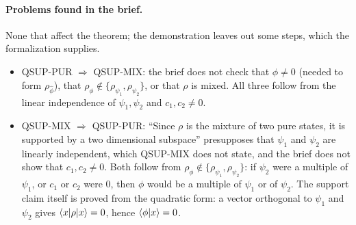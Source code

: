 \documentclass[11pt]{article}
\begin{document}
\paragraph{Problems found in the brief.} None that affect the theorem; the demonstration leaves
out some steps, which the formalization supplies.
\begin{itemize}
\item QSUP-PUR $\Rightarrow$ QSUP-MIX: the brief does not check that $\hat\phi \ne 0$ (needed to
  form $\rho_{\hat\phi}$), that $\rho_\phi \notin \{\rho_{\psi_1}, \rho_{\psi_2}\}$, or that $\rho$
  is mixed. All three follow from the linear independence of $\psi_1, \psi_2$ and
  $c_1, c_2 \ne 0$.
\item QSUP-MIX $\Rightarrow$ QSUP-PUR: ``Since $\rho$ is the mixture of two pure states, it is
  supported by a two dimensional subspace'' presupposes that $\psi_1$ and $\psi_2$ are linearly
  independent, which QSUP-MIX does not state, and the brief does not show that $c_1, c_2 \ne 0$.
  Both follow from $\rho_\phi \notin \{\rho_{\psi_1}, \rho_{\psi_2}\}$: if $\psi_2$ were a
  multiple of $\psi_1$, or $c_1$ or $c_2$ were $0$, then $\phi$ would be a multiple of $\psi_1$ or
  of $\psi_2$. The support claim itself is proved from the quadratic form: a vector orthogonal to
  $\psi_1$ and $\psi_2$ gives $\braket{x|\rho|x} = 0$, hence $\braket{\phi|x} = 0$.
\end{itemize}
\end{document}
